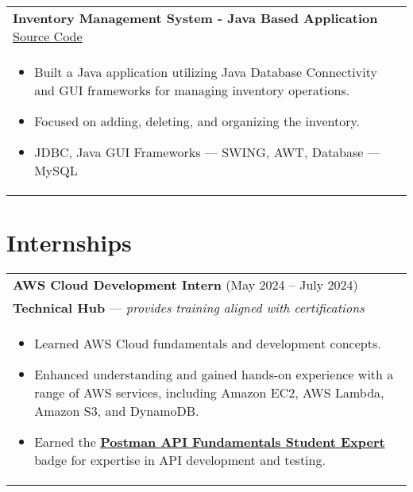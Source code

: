 \documentclass[a4paper,10pt]{article}
\begin{document}
\begin{tabularx}{\linewidth}{ @{} X  @{} }
    \textbf{Inventory Management System - Java Based Application} \hfill\href{https://github.com/omteja04/InventoryManagementSystem}{\underline{Source Code}}  \\[-0.3em]
    \begin{itemize}
        \item \textcolor{bullets}{Built a Java application utilizing Java Database Connectivity and GUI frameworks for managing inventory operations.}
        \item \textcolor{bullets}{Focused on adding, deleting, and organizing the inventory.}
        \item {JDBC, Java GUI Frameworks --- SWING, AWT, Database --- MySQL}
    \end{itemize}
    
\end{tabularx}


\section{Internships}
\begin{tabularx}{\linewidth}{ @{} X @{} }
\textbf{AWS Cloud Development Intern} \hfill (May 2024 – July 2024) \\
\small \textbf{Technical Hub} --- \emph{provides training aligned with certifications} \\[-0.3em]
    \begin{itemize}
       \item \textcolor{bullets}{Learned AWS Cloud fundamentals and development concepts.}
       \item \textcolor{bullets}{Enhanced understanding and gained hands-on experience with a range of AWS services, including Amazon EC2, AWS Lambda, Amazon S3, and DynamoDB.}
        \item \textcolor{bullets}{Earned the } \href{https://rb.gy/yomey5}{\textbf{Postman API Fundamentals Student Expert}} \textcolor{bullets}{ badge for expertise in API development and testing.}

    \end{itemize} 
\end{tabularx}

\vspace{-0.9em} %
\end{document}
